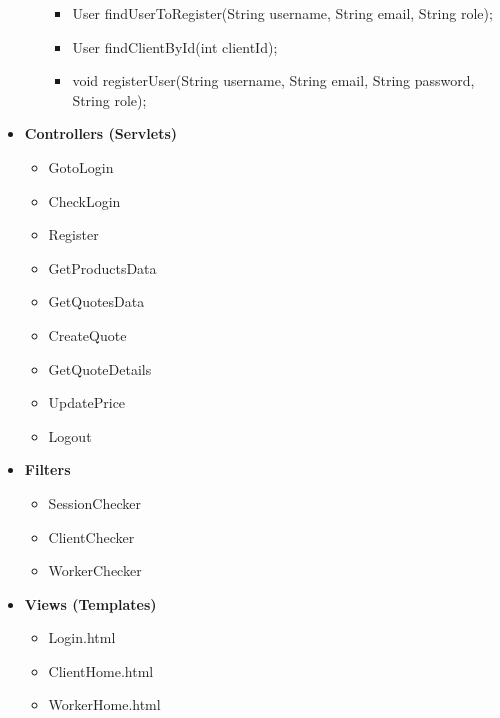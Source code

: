 \documentclass[a4paper, 12pt]{article}
\begin{document}
\begin{itemize}
\begin{itemize}
\begin{itemize}
			\item User findUserToRegister(String username, String email, String role);
			\item User findClientById(int clientId);
			\item void registerUser(String username, String email, String password, String role);
		\end{itemize}
	\end{itemize}
	\item \textbf{Controllers (Servlets)}
	\begin{itemize}
		\item GotoLogin
		\item CheckLogin
		\item Register
		\item GetProductsData
		\item GetQuotesData
		\item CreateQuote
		\item GetQuoteDetails
		\item UpdatePrice
		\item Logout
	\end{itemize}
	\item \textbf{Filters}
	\begin{itemize}
		\item SessionChecker
		\item ClientChecker
		\item WorkerChecker
	\end{itemize}
	\item \textbf{Views (Templates)}
	\begin{itemize}
		\item Login.html
		\item ClientHome.html
		\item WorkerHome.html
	\end{itemize}
\end{itemize}
\end{document}
